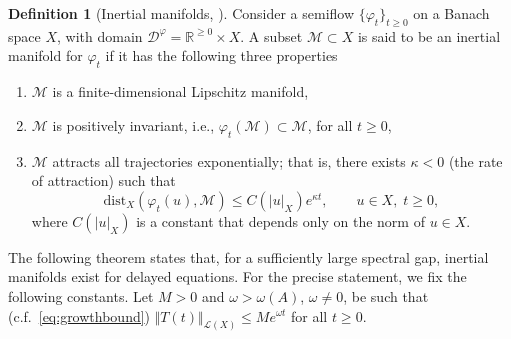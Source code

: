 \documentclass[a4paper, 12pt, oneside, reqno, notitlepage]{amsart}
\theoremstyle{plain}
\theoremstyle{definition}
\newtheorem{definition}[theorem]{Definition}
\theoremstyle{remark}
\begin{document}
\begin{definition}[Inertial manifolds, \cite{foias1988inertial,robinson2001}] \label{def:IM}
    Consider a semiflow $\{\varphi_t\}_{t \geq 0}$ on a Banach space $X$, with domain $\mathcal{D}^\varphi = \mathbb{R}^{\geq 0} \times X$.
    A subset $\mathcal{M} \subset X$ is said to be an inertial manifold for $\varphi_t$ if it has the following three properties
    \begin{enumerate}
        \item $\mathcal{M}$ is a finite-dimensional Lipschitz manifold,
        \item $\mathcal{M}$ is positively invariant, i.e., $\varphi_t(\mathcal{M}) \subset \mathcal{M}$, for all $t \geq 0$,
        \item $\mathcal{M}$ attracts all trajectories exponentially; that is, there exists $\kappa < 0$ (the rate of attraction) such that
        \begin{displaymath}
            \mathrm{dist}_X(\varphi_t(u),\mathcal{M}) \leq C(|u|_X) e^{ \kappa t}, \qquad  u \in X, \; t \geq 0,
        \end{displaymath}
        where $C(|u|_X)$ is a constant that depends only on the norm of $u \in X$.
    \end{enumerate}
\end{definition}


The following theorem states that, for a sufficiently large spectral gap, inertial manifolds exist for delayed equations.
For the precise statement, we fix the following constants.
Let $M > 0$ and $\omega > \omega(A)$, $\omega \neq 0$, be such that (c.f.\ \eqref{eq:growthbound}) $\Vert T(t) \Vert_{\mathcal{L}(X)} \leq M e^{\omega t}$ for all $t \geq 0$.
\end{document}
